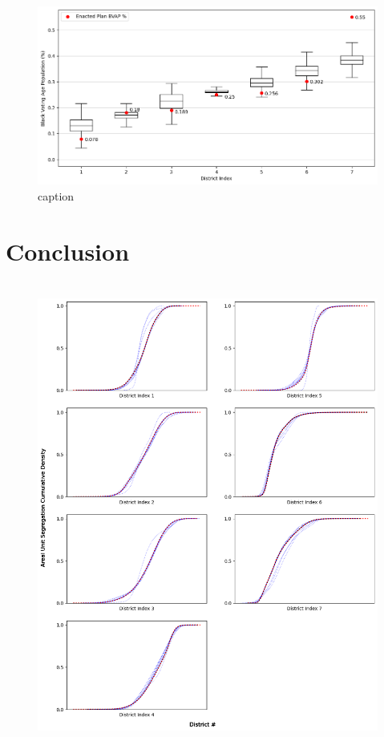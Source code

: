 \documentclass{article}
\begin{document}
\begin{figure}[h]\label{fig 9}
    \centering
    \includegraphics[scale=.5]{images/bvap_compare.png}
    \caption{caption}
\end{figure}

\section{Conclusion}

\appendix
\section{}\label{convergence appendix}

\begin{figure}
    \centering
    \includegraphics[scale=.6]{images/asu_kde_convergence.png}
\end{figure}
\end{document}
